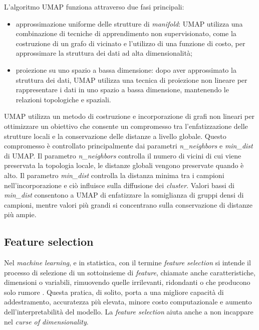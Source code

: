 \documentclass[12pt,italian]{report}
\begin{document}
	L'algoritmo UMAP funziona attraverso due fasi principali:
	\begin{itemize}
		\item approssimazione uniforme delle strutture di \textit{manifold}: UMAP utilizza una combinazione di tecniche di apprendimento non supervisionato, come la costruzione di un grafo di vicinato e l'utilizzo di una funzione di costo, per approssimare la struttura dei dati ad alta dimensionalità;
		\item proiezione su uno spazio a bassa dimensione: dopo aver approssimato la struttura dei dati, UMAP utilizza una tecnica di proiezione non lineare per rappresentare i dati in uno spazio a bassa dimensione, mantenendo le relazioni topologiche e spaziali.
	\end{itemize}
	UMAP utilizza un metodo di costruzione e incorporazione di grafi non lineari per ottimizzare un obiettivo che consente un compromesso tra l'enfatizzazione delle strutture locali e la conservazione delle distanze a livello globale. Questo compromesso è controllato principalmente dai parametri \textit{n\_neighbors} e \textit{min\_dist} di UMAP. 
	Il parametro \textit{n\_neighbors} controlla il numero di vicini di cui viene preservata la topologia locale, le distanze globali vengono preservate quando è alto. Il parametro \textit{min\_dist} controlla la distanza minima tra i campioni nell'incorporazione e ciò influisce sulla diffusione dei \textit{cluster}. Valori bassi di \textit{min\_dist} consentono a UMAP di enfatizzare la somiglianza di gruppi densi di campioni, mentre valori più grandi si concentrano sulla conservazione di distanze più ampie.
	
	\subsection{Feature selection}
	\label{FeatureSelection}
	Nel \textit{machine learning}, e in statistica, con il termine \textit{feature selection} si intende il processo di selezione di un sottoinsieme di \textit{feature}, chiamate anche caratteristiche, dimensioni o variabili, rimuovendo quelle irrilevanti, ridondanti o che producono solo rumore \cite{featureSelection}. Questa pratica, di solito, porta a una migliore capacità di addestramento, accuratezza più elevata, minore costo computazionale e aumento dell'interpretabilità del modello. La \textit{feature selection} aiuta anche a non incappare nel \textit{curse of dimensionality}.
	
\end{document}
